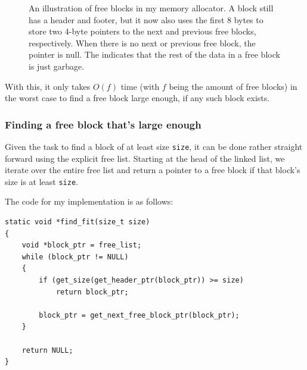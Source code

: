 \begin{figure}[H]
  \centering
  \hbox{}
  \caption{An illustration of free blocks in my memory allocator. A block still has a header and footer, but it now also uses the first 8 bytes to store two 4-byte pointers to the next and previous free blocks, respectively. When there is no next or previous free block, the pointer is null. The  indicates that the rest of the data in a free block is just garbage.}
  \label{fig:free-list-structure}
\end{figure}

With this, it only takes $O(f)$ time (with $f$ being the amount of free blocks) in the worst case to find a free block large enough, if any such block exists.

\subsubsection{Finding a free block that's large enough}
\label{sec:find-fit}

Given the task to find a block of at least size \texttt{size}, it can be done rather straight forward using the explicit free list. Starting at the head of the linked list, we iterate over the entire free list and return a pointer to a free block if that block's size is at least \texttt{size}.

The code for my implementation is as follows:

\bgroup
\small
\begin{verbatim}
static void *find_fit(size_t size)
{
    void *block_ptr = free_list;
    while (block_ptr != NULL)
    {
        if (get_size(get_header_ptr(block_ptr)) >= size)
            return block_ptr;

        block_ptr = get_next_free_block_ptr(block_ptr);
    }

    return NULL;
}
\end{verbatim}
\egroup

